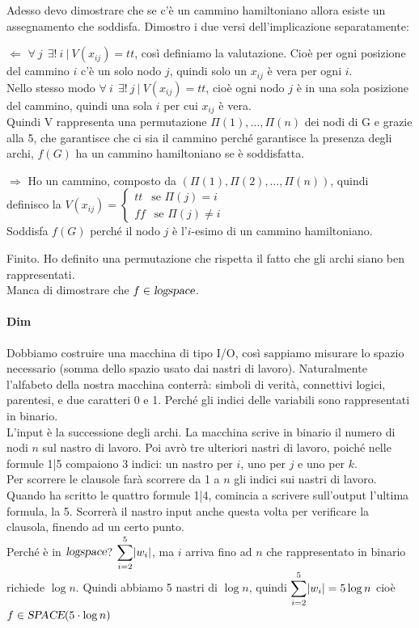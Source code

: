 \documentclass[10pt]{book}
\begin{document}
Adesso devo dimostrare che se c'è un cammino hamiltoniano allora esiste un assegnamento che soddisfa. Dimostro i due versi dell'implicazione separatamente:
\begin{list}{}{}
	\item[$\Leftarrow$] $\forall\:j\:\:\exists!\:i\:|\:V(x_{ij}) = tt$, così definiamo la valutazione. Cioè per ogni posizione del cammino $i$ c'è un solo nodo $j$, quindi solo un $x_{ij}$ è vera per ogni $i$.\\
	Nello stesso modo $\forall\:i\:\:\exists!\:j\:|\:V(x_{ij}) = tt$, cioè ogni nodo $j$ è in una sola posizione del cammino, quindi una sola $i$ per cui $x_{ij}$ è vera.\\
	Quindi V rappresenta una permutazione $\Pi(1),\ldots,\Pi(n)$ dei nodi di G e grazie alla 5, che garantisce che ci sia il cammino perché garantisce la presenza degli archi, $f(G)$ ha un cammino hamiltoniano se è soddisfatta.
	\item[$\Rightarrow$] Ho un cammino, composto da $(\Pi(1), \Pi(2), \ldots, \Pi(n))$, quindi definisco la $V(x_{ij}) = \left\{\begin{array}{l}
	tt\:\:\text{ se }\Pi(j) = i\\
	ff\:\:\text{ se }\Pi(j) \neq i
\end{array}	 \right.$\\
	Soddisfa $f(G)$ perché il nodo $j$ è l'$i$-esimo di un cammino hamiltoniano.
\end{list}
Finito. Ho definito una permutazione che rispetta il fatto che gli archi siano ben rappresentati.\\Manca di dimostrare che $f \in \textsl{logspace}$.
\paragraph{Dim} Dobbiamo costruire una macchina di tipo I/O, così sappiamo misurare lo spazio necessario (somma dello spazio usato dai nastri di lavoro). Naturalmente l'alfabeto della nostra macchina conterrà: simboli di verità, connettivi logici, parentesi, e due caratteri 0 e 1. Perché gli indici delle variabili sono rappresentati in binario.\\
L'input è la successione degli archi. La macchina scrive in binario il numero di nodi $n$ sul nastro di lavoro. Poi avrò tre ulteriori nastri di lavoro, poiché nelle formule 1|5 compaiono 3 indici: un nastro per $i$, uno per $j$ e uno per $k$.\\
Per scorrere le clausole farà scorrere da 1 a $n$ gli indici sui nastri di lavoro. Quando ha scritto le quattro formule 1|4, comincia a scrivere sull'output l'ultima formula, la 5. Scorrerà il nastro input anche questa volta per verificare la clausola, finendo ad un certo punto.\\
Perché è in $\textsl{logspace}$? $\mathlarger{\sum_{i=2}^5} |w_i|$, ma $i$ arriva fino ad $n$ che rappresentato in binario richiede $\log n$. Quindi abbiamo 5 nastri di $\log n$, quindi $\mathlarger{\sum_{i=2}^5} |w_i| = 5\log n$ cioè $f\in \textsl{SPACE}(5\cdot\log n)$
\end{document}
